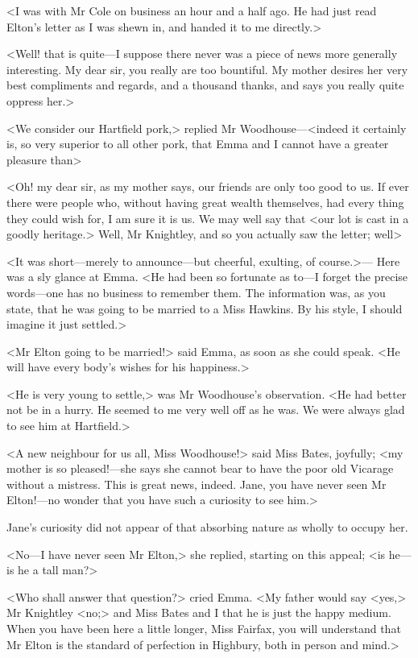 <I was with Mr Cole on business an hour and a half ago. He had just read Elton's letter as I was shewn in, and handed it to me directly.>

<Well! that is quite—I suppose there never was a piece of news more generally interesting. My dear sir, you really are too bountiful. My mother desires her very best compliments and regards, and a thousand thanks, and says you really quite oppress her.>

<We consider our Hartfield pork,> replied Mr Woodhouse—<indeed it certainly is, so very superior to all other pork, that Emma and I cannot have a greater pleasure than\longdash>

<Oh! my dear sir, as my mother says, our friends are only too good to us. If ever there were people who, without having great wealth themselves, had every thing they could wish for, I am sure it is us. We may well say that <our lot is cast in a goodly heritage.> Well, Mr Knightley, and so you actually saw the letter; well\longdash>

<It was short—merely to announce—but cheerful, exulting, of course.>— Here was a sly glance at Emma. <He had been so fortunate as to—I forget the precise words—one has no business to remember them. The information was, as you state, that he was going to be married to a Miss Hawkins. By his style, I should imagine it just settled.>

<Mr Elton going to be married!> said Emma, as soon as she could speak. <He will have every body's wishes for his happiness.>

<He is very young to settle,> was Mr Woodhouse's observation. <He had better not be in a hurry. He seemed to me very well off as he was. We were always glad to see him at Hartfield.>

<A new neighbour for us all, Miss Woodhouse!> said Miss Bates, joyfully; <my mother is so pleased!—she says she cannot bear to have the poor old Vicarage without a mistress. This is great news, indeed. Jane, you have never seen Mr Elton!—no wonder that you have such a curiosity to see him.>

Jane's curiosity did not appear of that absorbing nature as wholly to occupy her.

<No—I have never seen Mr Elton,> she replied, starting on this appeal; <is he—is he a tall man?>

<Who shall answer that question?> cried Emma. <My father would say <yes,> Mr Knightley <no;> and Miss Bates and I that he is just the happy medium. When you have been here a little longer, Miss Fairfax, you will understand that Mr Elton is the standard of perfection in Highbury, both in person and mind.>

